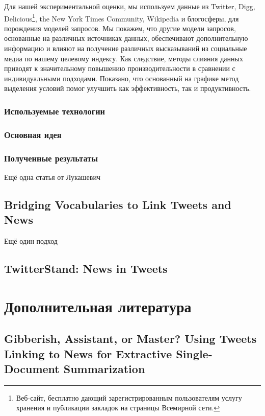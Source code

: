 \documentclass[12pt,a4paper,oneside]{extarticle}
\begin{document}
            Для нашей экспериментальной оценки, мы используем данные из Twitter, Digg, Delicious\footnote{Веб-сайт, бесплатно дающий зарегистрированным пользователям услугу хранения и публикации закладок на страницы Всемирной сети.}, the New York Times Community, Wikipedia и блогосферы, для порождения моделей запросов.
            Мы покажем, что другие модели запросов, основанные на различных источниках данных, обеспечивают дополнительную информацию и влияют на получение различных высказываний из социальные медиа по нашему целевому индексу.
            Как следствие, методы слияния данных приводят к значительному повышению производительности в сравнении с индивидуальными подходами.
            Показано, что основанный на графике метод выделения условий помог улучшить как эффективность, так и продуктивность.
        
        \subsubsection{Используемые технологии}

        \subsubsection{Основная идея}

        \subsubsection{Полученные результаты}

        Ещё одна статья от Лукашевич
    \subsection{Bridging Vocabularies to Link Tweets and News}
        Ещё один подход
    \subsection{TwitterStand: News in Tweets}

\section{Дополнительная литература}
    \subsection{Gibberish, Assistant, or Master? Using Tweets Linking to News for Extractive Single-Document Summarization}
\end{document}
